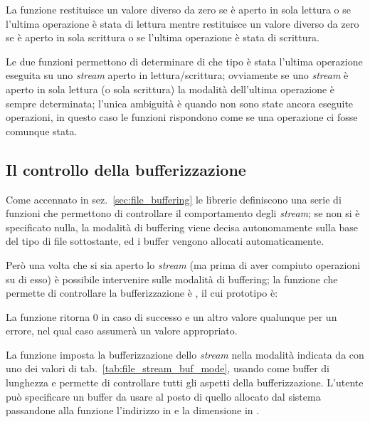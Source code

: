 La funzione  restituisce un valore diverso da zero
se  è aperto in sola lettura o se l'ultima operazione è stata di
lettura mentre  restituisce un valore diverso da zero
se  è aperto in sola scrittura o se l'ultima operazione è stata
di scrittura.

Le due funzioni permettono di determinare di che tipo è stata l'ultima
operazione eseguita su uno \textit{stream} aperto in lettura/scrittura;
ovviamente se uno \textit{stream} è aperto in sola lettura (o sola scrittura)
la modalità dell'ultima operazione è sempre determinata; l'unica ambiguità è
quando non sono state ancora eseguite operazioni, in questo caso le funzioni
rispondono come se una operazione ci fosse comunque stata.


\subsection{Il controllo della bufferizzazione}
\label{sec:file_buffering_ctrl}

Come accennato in sez.~\ref{sec:file_buffering} le librerie definiscono una
serie di funzioni che permettono di controllare il comportamento degli
\textit{stream}; se non si è specificato nulla, la modalità di buffering viene
decisa autonomamente sulla base del tipo di file sottostante, ed i buffer
vengono allocati automaticamente.

Però una volta che si sia aperto lo \textit{stream} (ma prima di aver compiuto
operazioni su di esso) è possibile intervenire sulle modalità di buffering; la
funzione che permette di controllare la bufferizzazione è , il
cui prototipo è:

\begin{funcproto}{
}

{La funzione ritorna $0$ in caso di successo e un altro valore qualunque per
  un errore, nel qual caso  assumerà un valore appropriato.}  
\end{funcproto}

La funzione imposta la bufferizzazione dello \textit{stream} 
nella modalità indicata da  con uno dei valori di
tab.~\ref{tab:file_stream_buf_mode}, usando  come buffer di
lunghezza  e permette di controllare tutti gli aspetti della
bufferizzazione. L'utente può specificare un buffer da usare al posto di
quello allocato dal sistema passandone alla funzione l'indirizzo
in  e la dimensione in .

